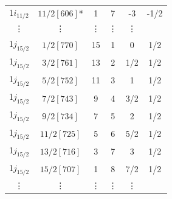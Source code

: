 \documentclass[8pt,a4paper, twoside]{report}
\begin{document}
\begin{table}[htbp]
\begin{tabular}{|c|c|c|c|c|c|}
1$i_{11/2}$ & $11/2[606]$*           & 1          & 7             & -3       & -1/2        \\
\vdots      & \vdots                & \vdots     & \vdots        & \vdots           \\
\midrule
1$j_{15/2}$ & $1/2[770]$            & 15         & 1             & 0          & 1/2     \\
1$j_{15/2}$ & $3/2[761]$            & 13         & 2             & 1/2       & 1/2        \\
1$j_{15/2}$ & $5/2[752]$            & 11         & 3             & 1           & 1/2    \\
1$j_{15/2}$ & $7/2[743]$            & 9          & 4             & 3/2        & 1/2       \\
1$j_{15/2}$ & $9/2[734]$            & 7          & 5             & 2         & 1/2      \\
1$j_{15/2}$ & $11/2[725]$            & 5          & 6             & 5/2         & 1/2      \\
1$j_{15/2}$ & $13/2[716]$            & 3          & 7             & 3       & 1/2        \\
1$j_{15/2}$ & $15/2[707]$            & 1          & 8             & 7/2       & 1/2        \\
\vdots      & \vdots                & \vdots     & \vdots        & \vdots           \\
\bottomrule
\bottomrule
\end{tabular}
\end{table}
\newpage
\end{document}
